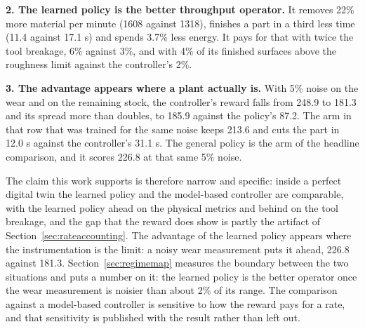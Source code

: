 \documentclass[11pt,a4paper]{article}
\begin{document}
\textbf{2. The learned policy is the better throughput operator.} It removes 22\% more material per minute (1608 against 1318), finishes a part in a third less time (11.4 against 17.1 s) and spends 3.7\% less energy. It pays for that with twice the tool breakage, 6\% against 3\%, and with 4\% of its finished surfaces above the roughness limit against the controller's 2\%.

\textbf{3. The advantage appears where a plant actually is.} With 5\% noise on the wear and on the remaining stock, the controller's reward falls from 248.9 to 181.3 and its spread more than doubles, to 185.9 against the policy's 87.2. The arm in that row that was trained for the same noise keeps 213.6 and cuts the part in 12.0 s against the controller's 31.1 s. The general policy is the arm of the headline comparison, and it scores 226.8 at that same 5\% noise.

The claim this work supports is therefore narrow and specific: inside a perfect digital twin the learned policy and the model-based controller are comparable, with the learned policy ahead on the physical metrics and behind on the tool breakage, and the gap that the reward does show is partly the artifact of Section~\ref{sec:rateaccounting}. The advantage of the learned policy appears where the instrumentation is the limit: a noisy wear measurement puts it ahead, 226.8 against 181.3. Section~\ref{sec:regimemap} measures the boundary between the two situations and puts a number on it: the learned policy is the better operator once the wear measurement is noisier than about 2\% of its range. The comparison against a model-based controller is sensitive to how the reward pays for a rate, and that sensitivity is published with the result rather than left out.
\end{document}
